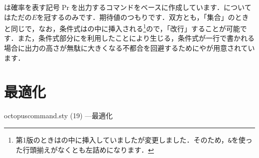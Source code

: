 \documentclass[uplatex]{jsreport}
\begin{document}
は確率を表す記号$\Pr$を出力するコマンドをベースに作成しています．についてはただの$E$を冠するのみです．期待値のつもりです．双方とも，「集合」のときと同じで，なお，条件式はの中に挿入される\footnote{第1版のときはの中に挿入していましたが変更しました．そのため，\texttt{\&}を使った行頭揃えがなくとも左詰めになります．}ので，「改行」することが可能です．また，条件式部分にを利用したことにより生じる，条件式が一行で書かれる場合に出力の高さが無駄に大きくなる不都合を回避するためにやが用意されています．
\par
\section{最適化}
\begin{insertcode}[firstnumber=266]{octopuscommand.sty (19) ---最適化}
\newdimen{\octopus@condwidth}

%
%
\end{insertcode}
\end{document}
